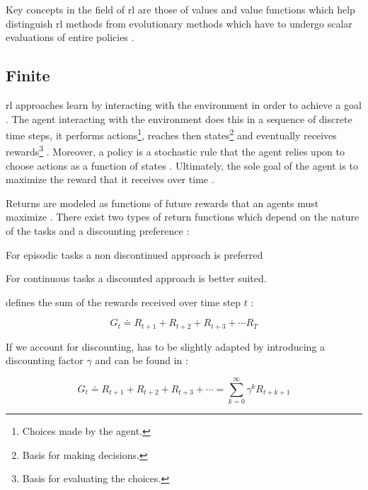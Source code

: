 Key concepts in the field of \gls{rl} are those of values and value functions which help distinguish \gls{rl} methods from evolutionary methods which have to undergo scalar evaluations of entire policies \citep[p. 15]{Sutton2017}.

\subsection{Finite }

\gls{rl} approaches learn by interacting with the environment in order to achieve a goal \citep{Sutton2017}. The agent interacting with the environment does this in a sequence of discrete time steps, it performs actions\footnote{Choices made by the agent.}, reaches then states\footnote{Basis for making decisions.} and eventually receives rewards\footnote{Basis for evaluating the choices.} \citep[p. 73]{Sutton2017}. Moreover, a policy is a stochastic rule that the agent relies upon to choose actions as a function of states \citep[p. 73]{Sutton2017}. Ultimately, the sole goal of the agent is to maximize the reward that it receives over time \citep[p. 73]{Sutton2017}.

Returns are modeled as functions of future rewards that an agents must maximize \citep[p. 73]{Sutton2017}. There exist two types of return functions which depend on the nature of the tasks and a discounting preference \citep[p. 73]{Sutton2017}:
\begin{enumerate*}
	\item For episodic tasks a non discontinued approach is preferred
	\item For continuous tasks a discounted approach is better suited.
\end{enumerate*}

 defines the sum of the rewards received over time step $t$ \citep[p. 73]{Sutton2017}:

\begin{equation}
\label{eq:expected_return}
	G_t  \doteq R_{t+1} + R_{t+2} + R_{t+3} + \cdots R_{T}
\end{equation}

If we account for discounting,  has to be slightly adapted by introducing a discounting factor $\gamma$ and can be found in :

\begin{equation}
\label{eq:expected_discounted_return}
	G_t  \doteq R_{t+1} + R_{t+2} + R_{t+3} + \cdots = \sum_{k=0}^\infty \gamma^k R_{t+k+1}
\end{equation}

